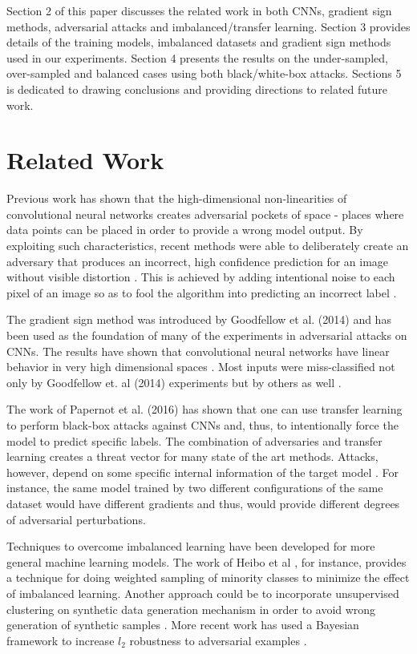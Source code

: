 \documentclass[runningheads,a4paper]{llncs}
\begin{document}
Section 2 of this paper discusses the related work in both CNNs, gradient sign methods, adversarial attacks and imbalanced/transfer learning. Section 3 provides details of the training models, imbalanced datasets and gradient sign methods used in our experiments. Section 4 presents the results on the under-sampled, over-sampled and balanced cases using both black/white-box attacks. Sections 5 is dedicated to drawing conclusions and providing directions to related future work.
\section{Related Work}


Previous work has shown that the high-dimensional non-linearities of convolutional neural networks \cite{lawrence1997face} creates adversarial pockets of space - places where data points can be placed in order to provide a wrong model output. By exploiting such characteristics, recent methods were able to deliberately create an adversary that produces an incorrect, high confidence prediction for an image without visible distortion \cite{papernot_thesis_2016}. This is achieved by adding intentional noise to each pixel of an image so as to fool the algorithm into predicting an incorrect label \cite{goodfellow2014,papernot2016transf,szegedy2013}.

The gradient sign method was introduced by Goodfellow et al. (2014) and has been used as the foundation of many of the experiments in adversarial attacks on CNNs. The results have shown that convolutional neural networks have linear behavior in very high dimensional spaces \cite{goodfellow2014}.  Most inputs were miss-classified not only by Goodfellow et. al (2014) experiments but by others as well \cite{billovits,papernot2016}.

The work of Papernot et al. (2016) has shown that one can use transfer learning to perform black-box attacks against CNNs \cite{papernot2016transf,yosinski2014transferable} and, thus, to intentionally force the model to predict specific labels. The combination of adversaries and transfer learning creates a threat vector for many state of the art methods. Attacks, however, depend on some specific internal information of the target model \cite{lowd2005,papernot2016transf}. For instance, the same model trained by two different configurations of the same dataset would have different gradients and thus, would provide different degrees of adversarial perturbations.

Techniques to overcome imbalanced learning have been developed for more general machine learning models. The work of Heibo et al \cite{he2008adasyn}, for instance, provides a technique for doing weighted sampling of minority classes to minimize the effect of imbalanced learning. Another approach could be to incorporate unsupervised clustering on synthetic data generation mechanism in order to avoid wrong generation of synthetic samples \cite{Barua2011}. More recent work has used a Bayesian framework to increase $l_2$ robustness to adversarial examples \cite{billovits}.
\end{document}

